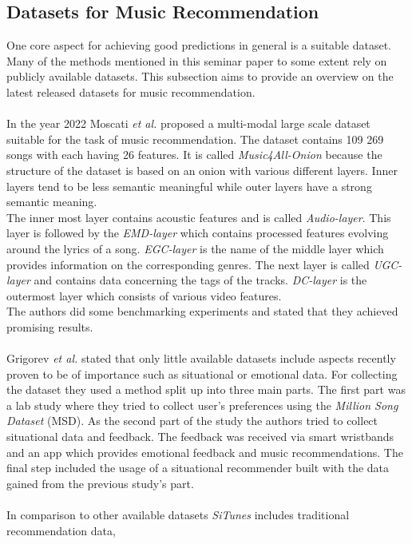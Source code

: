 \documentclass[runningheads,a4paper]{llncs}
\begin{document}
\subsection{Datasets for Music Recommendation}
One core aspect for achieving good predictions in general is a suitable dataset. Many of the methods mentioned in this seminar paper to some extent rely on publicly available datasets.
This subsection aims to provide an overview on the latest released datasets for music recommendation. \\
\\
In the year 2022 Moscati \textit{et al.} proposed a multi-modal large scale dataset suitable for the task of music recommendation. 
The dataset contains 109 269 songs with each having 26 features. It is called \textit{Music4All-Onion} because the structure of the dataset is based on an onion with various different layers.
Inner layers tend to be less semantic meaningful while outer layers have a strong semantic meaning. \\
The inner most layer contains acoustic features and is called \textit{Audio-layer}.
This layer is followed by the \textit{EMD-layer} which contains processed features evolving around the lyrics of a song.
\textit{EGC-layer} is the name of the middle layer which provides information on the corresponding genres.
The next layer is called \textit{UGC-layer} and contains data concerning the tags of the tracks. 
\textit{DC-layer} is the outermost layer which consists of various video features.\\
The authors did some benchmarking experiments and stated that they achieved promising results.\cite{moscati2022music4all}\\
\\
Grigorev \textit{et al.} stated that only little available datasets include aspects recently proven to be of importance such as situational or emotional data.
For collecting the dataset they used a method split up into three main parts.
The first part was a lab study where they tried to collect user's preferences using the \textit{Million Song Dataset} (MSD).
As the second part of the study the authors tried to collect situational data and feedback.
The feedback was received via smart wristbands and an app which provides emotional feedback and music recommendations.
The final step included the usage of a situational recommender built with the data gained from the previous study's part. \\
\\
In comparison to other available datasets \textit{SiTunes} includes traditional recommendation data, 
\end{document}
